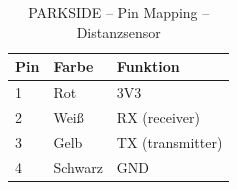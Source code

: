 \pagebreak[1]
\begin{table}[ht]
	\centering
	\caption{PARKSIDE – Pin Mapping – Distanzsensor}
	\label{parkside:pinmapping}
	\begin{tabular}{l|ll}
		\hline
		\textbf{Pin} & \textbf{Farbe} & \textbf{Funktion} \\ \hline
		1            & Rot            & 3V3               \\
		2            & Weiß           & RX (receiver)     \\
		3            & Gelb           & TX (transmitter)  \\
		4            & Schwarz        & GND               \\ \hline
	\end{tabular}
\end{table}
\pagebreak[1]







